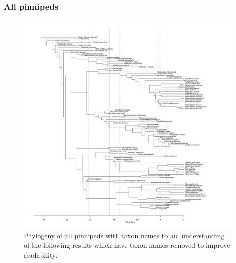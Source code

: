 \documentclass[a4paper, 12pt]{article}
\begin{document}
\subsubsection{All pinnipeds}

\begin{figure}[H]
 \centering
  \includegraphics[width = \linewidth]{figures/all-pinnipeds-tree.png}
  \caption{Phylogeny of all pinnipeds with taxon names to aid understanding of the following results which have taxon names removed to improve readability.}
  \label{fig-all-tree}
\end{figure} 
\end{document}
